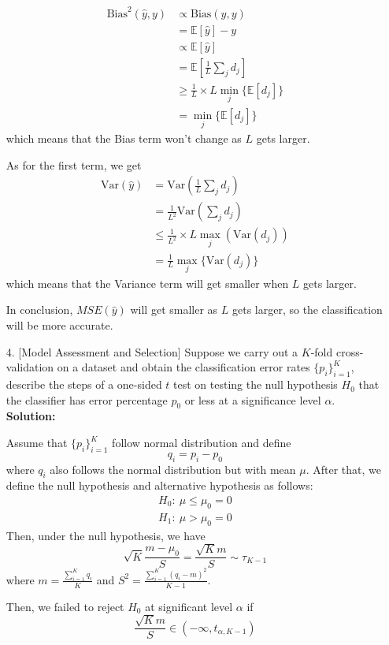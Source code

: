 \documentclass{article}
\newcommand{\E}{\mathbb{E}}
\newcommand{\Var}{\mathrm{Var}}
\newcommand{\Bias}{\mathrm{Bias}}
\begin{document}
\begin{enumerate}
        \begin{align*}
            \Bias^2(\hat{y},y)&\propto \Bias(\hat{y}, y)\\
            &= \E[\hat{y}]-y\\
            &\propto \E[\hat{y}]\\
            &= \E\left[\frac{1}{L}\sum_{j}d_j\right]\\
            &\geq \frac{1}{L}\times L\min_{j}\{\E[d_j]\}\\
            &= \min_j\{\E[d_j]\}
        \end{align*}
        which means that the Bias term won't change as $L$ gets larger.
        \par As for the first term, we get
        \begin{align*}
            \Var(\hat{y}) &= \Var\left(\frac{1}{L}\sum_{j}d_j\right)\\
            &= \frac{1}{L^2}\Var\left(\sum_{j}d_j\right)\\
            &\leq \frac{1}{L^2}\times L\max_j\left(\Var(d_j)\right)\\
            &= \frac{1}{L} \max_j\{\Var(d_j)\}
        \end{align*}
        which means that the Variance term will get smaller when $L$ gets larger.
        \par In conclusion, $MSE(\hat{y})$ will get smaller as $L$ gets larger, so the classification will be more accurate.
        \item [4.] [Model Assessment and Selection] Suppose we carry out a $K$-fold cross-validation on a dataset
        and obtain the classification error rates $\{p_i\}_{i=1}^K$, describe the steps of a one-sided $t$ test on testing the null
        hypothesis $H_0$ that the classifier has error percentage $p_0$ or less at a significance level $\alpha$.\newline
        {\bf Solution:}
        \par Assume that $\{p_i\}_{i=1}^K$ follow normal distribution and define
        \[q_i = p_i - p_0\]
        where $q_i$ also follows the normal distribution but with mean $\mu$.
        After that, we define the null hypothesis and alternative hypothesis as follows:
        \begin{align*}
            H_0:\ \mu \leq \mu_0=0\\
            H_1:\ \mu > \mu_0=0
        \end{align*}
        Then, under the null hypothesis, we have
        \[\sqrt{K}\frac{m-\mu_0}{S}=\frac{\sqrt{K}m}{S}\sim \tau_{K-1} \]
        where $m = \frac{\sum_{i=1}^K q_i}{K}$ and $S^2 = \frac{\sum_{i=1}^K(q_i-m)^2}{K-1}$.
        \par Then, we failed to reject $H_0$ at significant level $\alpha$ if
        \[ \frac{\sqrt {K}m}{S}\in (-\infty, t_{\alpha,K-1}) \]

    \end{enumerate}
\end{document}
